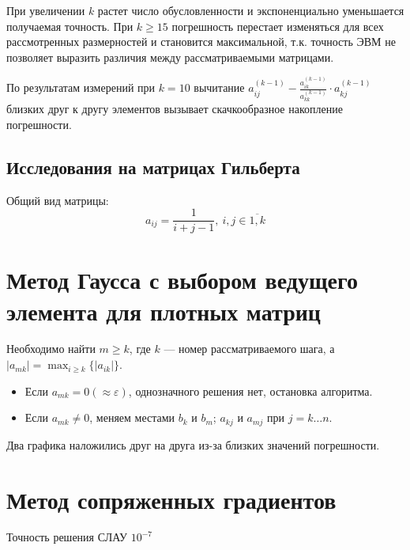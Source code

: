 



При увеличении $k$ растет число обусловленности и экспоненциально уменьшается получаемая точность.
При $k \geq 15$ погрешность перестает изменяться для всех рассмотренных размерностей и становится максимальной, т.к. точность ЭВМ не позволяет выразить различия между рассматриваемыми матрицами.

По результатам измерений при $k = 10$ вычитание
\(a_{ij}^{(k-1)} - \frac{a_{ik}^{(k-1)}}{a_{kk}^{(k-1)}} \cdot a_{kj}^{(k-1)}\)
близких друг к другу элементов вызывает скачкообразное накопление погрешности.

\subsection{Исследования на матрицах Гильберта}

Общий вид матрицы:
\[a_{ij} = \frac{1}{i + j - 1},\  i, j \in \overline{1, k}\]



\section{Метод Гаусса с выбором ведущего элемента для плотных матриц}

Необходимо найти \(m \geq k\), где \(k\) --- номер рассматриваемого шага, а \(|a_{mk}| = \max_{i \geq k} \{|a_{ik}|\} \).

\begin{itemize}
	\item Если \(a_{mk} = 0 (\approx \varepsilon)\), однозначного решения нет, остановка алгоритма.
	\item Если \(a_{mk} \neq 0\), меняем местами \(b_k\) и \(b_m\); \(a_{kj}\) и \(a_{mj}\) при \(j = k \dots n\).
\end{itemize}

\hfill
{}

Два графика наложились друг на друга из-за близких значений погрешности.

\section{Метод сопряженных градиентов}
Точность решения СЛАУ $10^{-7}$

